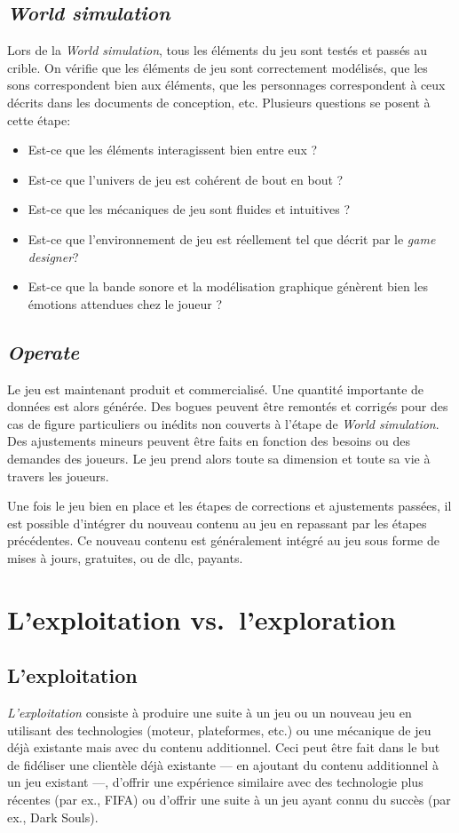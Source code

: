 \subsection{\emph{World simulation}}
Lors de la \emph{World simulation}, tous les éléments du jeu sont testés et passés au crible.
On vérifie que les éléments de jeu sont correctement modélisés, que les sons correspondent bien aux éléments, que les personnages correspondent à ceux décrits dans les documents de conception, etc.
Plusieurs questions se posent à cette \'etape:
\begin{itemize}
    \item Est-ce que les éléments interagissent bien entre eux ?
    \item Est-ce que l'univers de jeu est cohérent de bout en bout ?
    \item Est-ce que les mécaniques de jeu sont fluides et intuitives ?
    \item Est-ce que l'environnement de jeu est réellement tel que décrit par le \emph{game designer}?
    \item Est-ce que la bande sonore et la modélisation graphique génèrent bien les émotions attendues chez le joueur ?
\end{itemize}


\subsection{\emph{Operate}}
Le jeu est maintenant produit et commercialisé.
Une quantité importante de données est alors générée.
Des bogues peuvent être remontés et corrigés pour des cas de figure particuliers ou inédits non couverts \`a l'étape de \emph{World simulation}.
Des ajustements mineurs peuvent être faits en fonction des besoins ou des demandes des joueurs.
Le jeu prend alors toute sa dimension et toute sa vie à travers les joueurs.

Une fois le jeu bien en place et les étapes de corrections et ajustements passées, il est possible d'intégrer du nouveau contenu au jeu en repassant par les étapes précédentes.
Ce nouveau contenu est généralement intégré au jeu sous forme de mises à jours, gratuites, ou de \gls{dlc}, payants.



\section{L'exploitation vs.\ l'exploration}
\subsection{L'exploitation}
\emph{L'exploitation} consiste à produire une suite à un jeu ou un nouveau jeu en utilisant des technologies (moteur, plateformes, etc.) ou une mécanique de jeu déjà existante mais avec du contenu additionnel.
Ceci peut être fait dans le but de fidéliser une clientèle déjà existante --- en ajoutant du contenu additionnel à un jeu existant ---, d'offrir une expérience similaire avec des technologie plus récentes (par ex., FIFA) ou d'offrir une suite à un jeu ayant connu du succès (par ex., Dark Souls).

